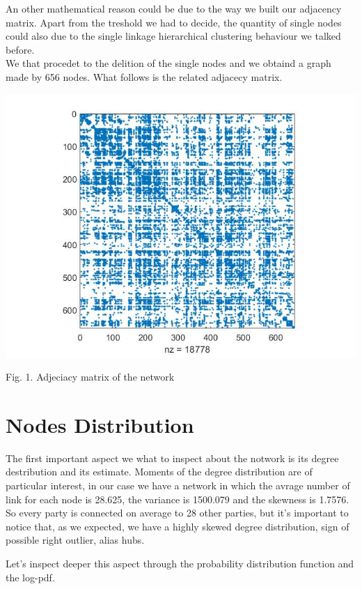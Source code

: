 \documentclass{article}%
\begin{document}
An other mathematical reason could be due to the way we built our adjacency matrix. Apart from the treshold we had to decide, the quantity of single nodes could also due to the single linkage hierarchical clustering behaviour we talked before. 
\\

We that procedet to the delition of the single nodes and we obtaind a graph made by 656 nodes.
What follows is the related adjacecy matrix.

\includegraphics[scale=0.5]{Adj}

\begin{center}
\begin{small}
Fig. 1. Adjeciacy matrix of the network
\end{small}
\end{center}

\section*{Nodes Distribution}

The first important aspect we what to inspect about the notwork is its degree destribution and its estimate. Moments of the degree distribution are of particular interest, in our case we have a network in which the avrage number of link for each node is 28.625, the variance is 1500.079 and the skewness is 1.7576.
So every party is connected on average to 28 other parties, but it's important to notice that, as we expected, we have a highly skewed degree distribution, sign of possible right outlier, alias hubs.


Let's inspect deeper this aspect through the probability distribution function and the log-pdf.
\end{document}
